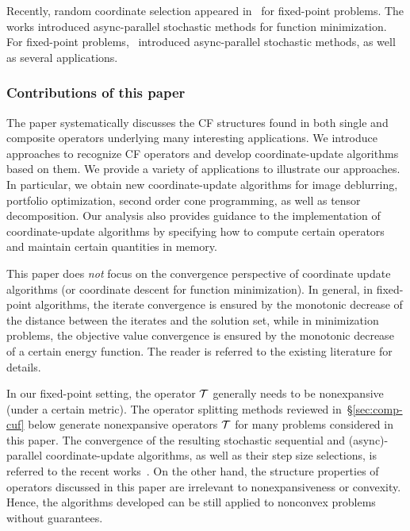 Recently, random coordinate selection appeared in~\cite{Patrick_2015} for fixed-point problems. The works \cite{nedic2001distributed,recht2011hogwild,liu2013asynchronous,liu2014asynchronous,hsieh2015passcode} introduced async-parallel stochastic methods for function minimization.
For fixed-point problems,~\cite{Peng_2015_AROCK} introduced  async-parallel stochastic methods, as well as several applications.  

\subsubsection{Contributions of this paper} 
The paper systematically discusses the CF structures found in both single and composite operators underlying many interesting applications. We introduce approaches to recognize CF operators and develop coordinate-update algorithms based on them. 
We provide a variety of applications to illustrate our approaches. 
In particular, we obtain new coordinate-update algorithms for image deblurring, portfolio optimization, second order cone programming, as well as tensor decomposition. Our analysis also provides guidance to the implementation of coordinate-update algorithms by specifying how to compute certain operators and maintain certain quantities in memory. 
 
This paper does \emph{not} focus on the convergence perspective of coordinate update algorithms (or coordinate descent for function minimization). In general, in fixed-point algorithms, the iterate convergence is ensured by the monotonic decrease of the distance between the iterates and the solution set, while in minimization problems, the objective value convergence is ensured by the monotonic decrease of a certain energy function. The reader is referred to the existing literature for details. 


In our fixed-point setting, the operator ${\mathcal{T}}$ generally needs to be  nonexpansive (under a certain metric). The operator splitting methods reviewed in~\S\ref{sec:comp-cuf} below generate nonexpansive operators ${\mathcal{T}}$ for many problems considered in this paper. The convergence of the resulting stochastic sequential and  (async)-parallel coordinate-update algorithms, as well as their step size selections, is referred to the recent works~\cite{Patrick_2015,Peng_2015_AROCK}. On the other hand, the structure properties of operators discussed in this paper are irrelevant to nonexpansiveness or convexity. Hence, the algorithms developed can be still applied to nonconvex problems without guarantees.


